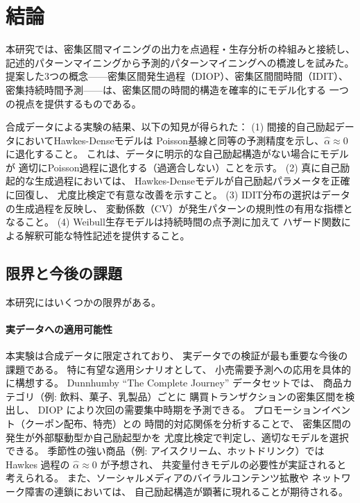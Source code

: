 \section{結論}\label{sec:conclusion}

本研究では、密集区間マイニングの出力を点過程・生存分析の枠組みと接続し、
記述的パターンマイニングから予測的パターンマイニングへの橋渡しを試みた。
提案した3つの概念——密集区間発生過程（DIOP）、密集区間間時間（IDIT）、
密集持続時間予測——は、密集区間の時間的構造を確率的にモデル化する
一つの視点を提供するものである。

合成データによる実験の結果、以下の知見が得られた：
(1) 間接的自己励起データにおいてHawkes-Denseモデルは
    Poisson基線と同等の予測精度を示し、$\hat{\alpha} \approx 0$ に退化すること。
    これは、データに明示的な自己励起構造がない場合にモデルが
    適切にPoisson過程に退化する（過適合しない）ことを示す。
(2) 真に自己励起的な生成過程においては、
    Hawkes-Denseモデルが自己励起パラメータを正確に回復し、
    尤度比検定で有意な改善を示すこと。
(3) IDIT分布の選択はデータの生成過程を反映し、
    変動係数（CV）が発生パターンの規則性の有用な指標となること。
(4) Weibull生存モデルは持続時間の点予測に加えて
    ハザード関数による解釈可能な特性記述を提供すること。

\subsection{限界と今後の課題}

本研究にはいくつかの限界がある。

\paragraph{実データへの適用可能性}
本実験は合成データに限定されており、
実データでの検証が最も重要な今後の課題である。
特に有望な適用シナリオとして、
小売需要予測への応用を具体的に構想する。
Dunnhumby ``The Complete Journey'' データセットでは、
商品カテゴリ（例: 飲料、菓子、乳製品）ごとに
購買トランザクションの密集区間を検出し、
DIOP により次回の需要集中時期を予測できる。
プロモーションイベント（クーポン配布、特売）との
時間的対応関係を分析することで、
密集区間の発生が外部駆動型か自己励起型かを
尤度比検定で判定し、適切なモデルを選択できる。
季節性の強い商品（例: アイスクリーム、ホットドリンク）では
Hawkes 過程の $\hat{\alpha} \approx 0$ が予想され、
共変量付きモデルの必要性が実証されると考えられる。
また、ソーシャルメディアのバイラルコンテンツ拡散や
ネットワーク障害の連鎖においては、
自己励起構造が顕著に現れることが期待される。

